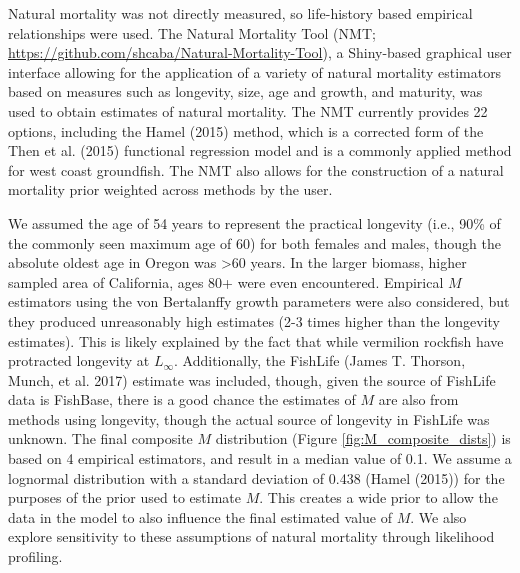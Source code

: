 \documentclass[11pt,
  english,
  a4paper,
]{article}
\begin{document}
Natural mortality was not directly measured, so life-history based empirical relationships were used. The Natural Mortality Tool (NMT; {\url{https://github.com/shcaba/Natural-Mortality-Tool}\leavevmode\tagmcend\tagstructend}), a Shiny-based graphical user interface allowing for the application of a variety of natural mortality estimators based on measures such as longevity, size, age and growth, and maturity, was used to obtain estimates of natural mortality. The NMT currently provides 22 options, including the Hamel {(2015)\leavevmode\tagmcend\tagstructend} method, which is a corrected form of the Then et al. {(2015)\leavevmode\tagmcend\tagstructend} functional regression model and is a commonly applied method for west coast groundfish. The NMT also allows for the construction of a natural mortality prior weighted across methods by the user.

\leavevmode\tagmcend\tagstructend\par


We assumed the age of 54 years to represent the practical longevity (i.e., 90\% of the commonly seen maximum age of 60) for both females and males, though the absolute oldest age in Oregon was \textgreater60 years. In the larger biomass, higher sampled area of California, ages 80+ were even encountered. Empirical {\(M\)\leavevmode\tagmcend\tagstructend} estimators using the von Bertalanffy growth parameters were also considered, but they produced unreasonably high estimates (2-3 times higher than the longevity estimates). This is likely explained by the fact that while vermilion rockfish have protracted longevity at {\(L_{\infty}\)\leavevmode\tagmcend\tagstructend}. Additionally, the FishLife {(James T. Thorson, Munch, et al. 2017)\leavevmode\tagmcend\tagstructend} estimate was included, though, given the source of FishLife data is FishBase, there is a good chance the estimates of {\(M\)\leavevmode\tagmcend\tagstructend} are also from methods using longevity, though the actual source of longevity in FishLife was unknown. The final composite {\(M\)\leavevmode\tagmcend\tagstructend} distribution (Figure \ref{fig:M_composite_dists}) is based on 4 empirical estimators, and result in a median value of 0.1. We assume a lognormal distribution with a standard deviation of 0.438 ({Hamel (2015)\leavevmode\tagmcend\tagstructend}) for the purposes of the prior used to estimate {\(M\)\leavevmode\tagmcend\tagstructend}. This creates a wide prior to allow the data in the model to also influence the final estimated value of {\(M\)\leavevmode\tagmcend\tagstructend}. We also explore sensitivity to these assumptions of natural mortality through likelihood profiling.
\end{document}

